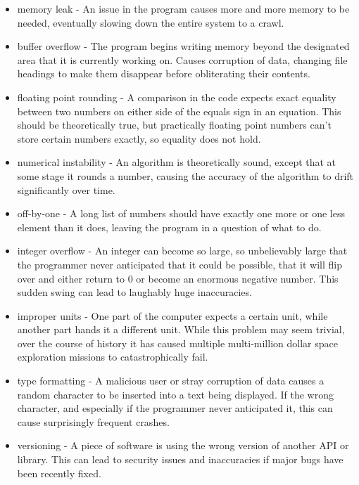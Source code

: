 \documentclass[a4paper]{article}
\begin{document}
\begin{minipage}[t]{0.45\linewidth}
\begin{itemize}[leftmargin=0cm]
\item memory leak - An issue in the program causes more and more memory to be needed, eventually slowing down the entire system to a crawl.
\item buffer overflow - The program begins writing memory beyond the designated area that it is currently working on. Causes corruption of data, changing file headings to make them disappear before obliterating their contents.
\item floating point rounding - A comparison in the code expects exact equality between two numbers on either side of the equals sign in an equation. This should be theoretically true, but practically floating point numbers can't store certain numbers exactly, so equality does not hold. 
\item numerical instability - An algorithm is theoretically sound, except that at some stage it rounds a number, causing the accuracy of the algorithm to drift significantly over time.
\item off-by-one - A long list of numbers should have exactly one more or one less element than it does, leaving the program in a question of what to do. 
\item integer overflow - An integer can become so large, so unbelievably large that the programmer never anticipated that it could be possible, that it will flip over and either return to 0 or become an enormous negative number. This sudden swing can lead to laughably huge inaccuracies. 
\item improper units - One part of the computer expects a certain unit, while another part hands it a different unit. While this problem may seem trivial, over the course of history it has caused multiple multi-million dollar space exploration missions to catastrophically fail.
\item type formatting - A malicious user or stray corruption of data causes a random character to be inserted into a text being displayed. If the wrong character, and especially if the programmer never anticipated it, this can cause surprisingly frequent crashes.
\item versioning - A piece of software is using the wrong version of another API or library. This can lead to security issues and inaccuracies if major bugs have been recently fixed. 
\end{itemize}
\end{minipage}
\end{document}
